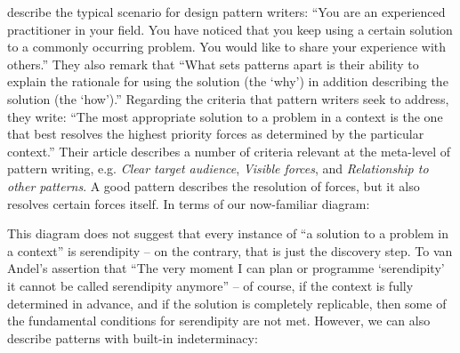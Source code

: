  describe the typical scenario for design
pattern writers: ``You are an experienced practitioner in your
field. You have noticed that you keep using a certain solution to a
commonly occurring problem. You would like to share your experience
with others.''  They also remark that ``What sets patterns apart is
their ability to explain the rationale for using the solution (the
`why') in addition describing the solution (the `how').''  Regarding
the criteria that pattern writers seek to address, they write: ``The
most appropriate solution to a problem in a context is the one that
best resolves the highest priority forces as determined by the
particular context.''  Their article describes a number of criteria
relevant at the meta-level of pattern writing, e.g. \emph{Clear target
  audience}, \emph{Visible forces}, and \emph{Relationship to other
  patterns}.  A good pattern describes the resolution of forces, but
it also resolves certain forces itself.  In terms of our now-familiar
diagram:



This diagram does not suggest that every instance of ``a solution to a
problem in a context'' is serendipity -- on the contrary, that is just
the discovery step.  To van Andel's assertion that ``The very moment I
can plan or programme `serendipity' it cannot be called serendipity
anymore'' -- of course, if the context is fully determined in advance,
and if the solution is completely replicable, then some of the
fundamental conditions for serendipity are not met.  However, we can
also describe patterns with built-in indeterminacy:

